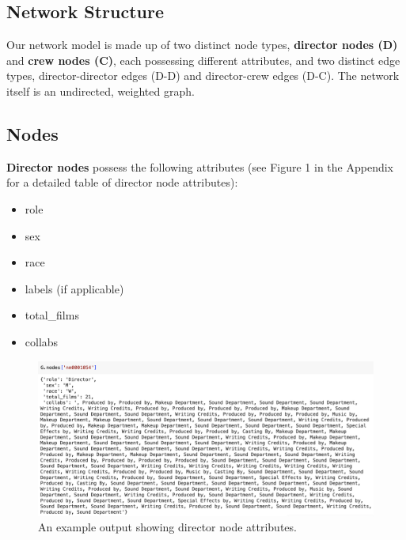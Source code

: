 \documentclass[12pt]{article}
\begin{document}
\subsection*{Network Structure}
Our network model is made up of two distinct node types,\textbf{ director nodes (D)} and \textbf{crew nodes (C)}, each possessing different attributes, and two distinct edge types, director-director edges (D-D) and director-crew edges (D-C). The network itself is an undirected, weighted graph.

\subsection*{Nodes}
\textbf{Director nodes} possess the following attributes (see Figure 1 in the Appendix for a detailed table of director node attributes):
\begin{itemize}[itemsep=-5pt]
    \item role
    \item sex
    \item race
    \item labels (if applicable)
    \item total\_films
    \item collabs
\end{itemize}
\begin{figure}[h!]
    \centering
    \includegraphics[width=0.5\linewidth]{director_node.png}
    \caption{An example output showing director node attributes.}
    \label{fig:dir_node}
\end{figure}
\end{document}
